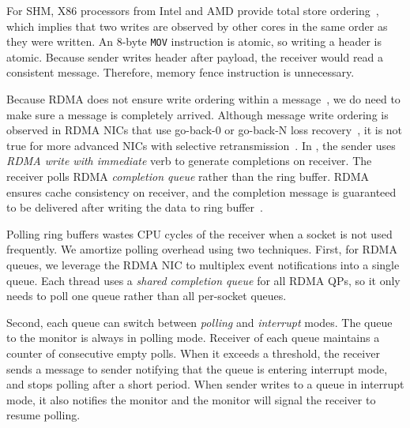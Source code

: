 For SHM, X86 processors from Intel and AMD provide total store ordering~\cite{sewell2010x86,intel-manual}, which implies that two writes are observed by other cores in the same order as they were written. An 8-byte \texttt{MOV} instruction is atomic, so writing a header is atomic. Because sender writes header after payload, the receiver would read a consistent message. Therefore, memory fence instruction is unnecessary.

Because RDMA does not ensure write ordering within a message~\cite{infiniband2000infiniband}, we do need to make sure a message is completely arrived. Although message write ordering is observed in RDMA NICs that use go-back-0 or go-back-N loss recovery~\cite{dragojevic2014farm}, it is not true for more advanced NICs with selective retransmission~\cite{mprdma,mittal2018revisiting}. In \libipc{}, the sender uses \textit{RDMA write with immediate} verb to generate completions on receiver. The receiver polls RDMA \emph{completion queue} rather than the ring buffer. RDMA ensures cache consistency on receiver, and the completion message is guaranteed to be delivered after writing the data to \libipc{} ring buffer~\cite{infiniband2000infiniband}.


Polling ring buffers wastes CPU cycles of the receiver when a socket is not used frequently. We amortize polling overhead using two techniques.
First, for RDMA queues, we leverage the RDMA NIC to multiplex event notifications into a single queue.
Each thread uses a \emph{shared completion queue} for all RDMA QPs, so it only needs to poll one queue rather than all per-socket queues.

Second, each queue can switch between \textit{polling} and \textit{interrupt} modes. The queue to the monitor is always in polling mode. Receiver of each queue maintains a counter of consecutive empty polls. When it exceeds a threshold, the receiver sends a message to sender notifying that the queue is entering interrupt mode, and stops polling after a short period. When sender writes to a queue in interrupt mode, it also notifies the monitor and the monitor will signal the receiver to resume polling.





